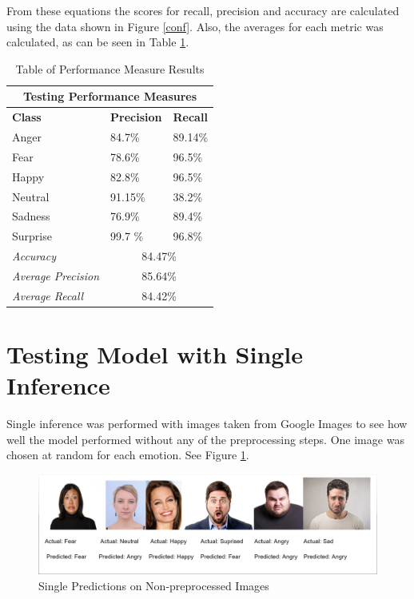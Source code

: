 From these equations the scores for recall, precision and accuracy are calculated using the data shown in Figure \ref{conf}. Also, the averages for each metric was calculated, as can be seen in Table \ref{table:per}.
\begin{table}[ht]
	\begin{center}
	\begin{tabular}{|p{5cm}||p{2cm}||p{2cm}|}		
		\hline
		
		\multicolumn{3}{|c|}{Testing Performance Measures} \\
		\hline
		\textbf{Class}& \textbf{Precision} &  \textbf{Recall}\\
		\hline
		Anger  & 84.7\% & 89.14\%	\\
		\hline
		Fear  & 78.6\% & 96.5\%	\\
		\hline
		Happy  & 82.8\% & 96.5\%  \\
		\hline
		Neutral & 91.15\% & 38.2\%	\\
		\hline	
		Sadness &  76.9\% & 89.4\%	\\
		\hline
		Surprise & 99.7 \% & 96.8\%	\\
		\hline	
		\hline 
		\textit{Accuracy} & \multicolumn{2}{|c|}{ 84.47\%} \\
		\hline
		\textit{Average Precision} & \multicolumn{2}{|c|}{ 85.64\%} \\
		\hline
		\textit{Average Recall} & \multicolumn{2}{|c|}{ 84.42\%} \\
		\hline
	\end{tabular}
	\caption{Table of Performance Measure Results}
	\label{table:per}
	\end{center}
\end{table}
	
\section{Testing Model with Single Inference}
Single inference was performed with images taken from Google Images to see how well the model performed without any of the preprocessing steps. One image was chosen at random for each emotion. See Figure \ref{inf}.

\begin{figure}[ht]
	\begin{center}
		\advance\leftskip-3cm
		\advance\rightskip-3cm
		\includegraphics[keepaspectratio=true,scale=0.21]{__resources/Testing/inference.png}
		\caption{Single Predictions on Non-preprocessed Images}
		\label{inf}
	\end{center}
\end{figure}


